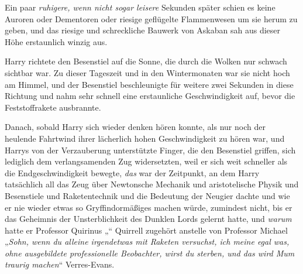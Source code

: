 Ein paar \emph{ruhigere, wenn nicht sogar leisere} Sekunden später schien es keine Auroren oder Dementoren oder riesige geflügelte Flammenwesen um sie herum zu geben, und das riesige und schreckliche Bauwerk von Askaban sah aus dieser Höhe erstaunlich winzig aus.

Harry richtete den Besenstiel auf die Sonne, die durch die Wolken nur schwach sichtbar war. Zu dieser Tageszeit und in den Wintermonaten war sie nicht hoch am Himmel, und der Besenstiel beschleunigte für weitere zwei Sekunden in diese Richtung und nahm sehr schnell eine erstaunliche Geschwindigkeit auf, bevor die Feststoffrakete ausbrannte.

Danach, sobald Harry sich wieder denken hören konnte, als nur noch der heulende Fahrtwind ihrer lächerlich hohen Geschwindigkeit zu hören war, und Harrys von der Verzauberung unterstützte Finger, die den Besenstiel griffen, sich lediglich dem verlangsamenden Zug widersetzten, weil er sich weit schneller als die Endgeschwindigkeit bewegte, \emph{das} war der Zeitpunkt, an dem Harry tatsächlich all das Zeug über Newtonsche Mechanik und aristotelische Physik und Besenstiele und Raketentechnik und die Bedeutung der Neugier dachte und wie er nie wieder etwas so Gryffindormäßiges machen würde, zumindest nicht, bis er das Geheimnis der Unsterblichkeit des Dunklen Lords gelernt hatte, und \emph{warum} hatte er Professor Quirinus „“ Quirrell zugehört anstelle von Professor Michael
„\emph{Sohn, wenn du alleine irgendetwas mit Raketen versuchst, ich meine \emph{egal was}, ohne ausgebildete professionelle Beobachter, wirst du sterben, und das wird Mum traurig machen}“ Verres-Evans.

